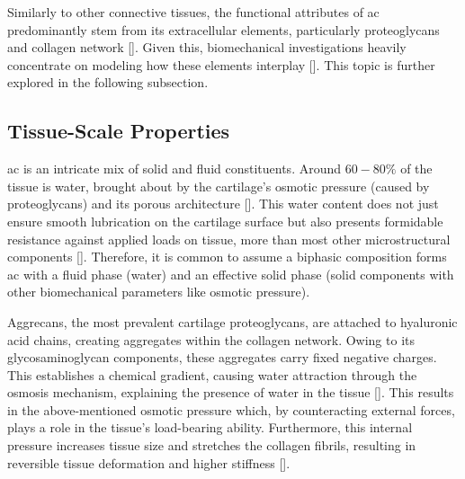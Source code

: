 Similarly to other connective tissues, the functional attributes of \ac{ac} predominantly stem from its extracellular elements, particularly proteoglycans and collagen network [\cite{culav1999,brody2015}]. Given this, biomechanical investigations heavily concentrate on modeling how these elements interplay [\cite{klika2016,ebrahimi2019,sajjadinia2019,lin2021,paz2022}]. This topic is further explored in the following subsection.

\subsection{Tissue-Scale Properties}
\Ac{ac} is an intricate mix of solid and fluid constituents. Around $60-80\%$ of the tissue is water, brought about by the cartilage's osmotic pressure (caused by proteoglycans) and its porous architecture [\cite{cederlund2022}]. This water content does not just ensure smooth lubrication on the cartilage surface but also presents formidable resistance against applied loads on tissue, more than most other microstructural components [\cite{quiroga2017,sajjadinia2019}]. Therefore, it is common to assume a biphasic composition forms \ac{ac} with a fluid phase (water) and an effective solid phase (solid components with other biomechanical parameters like osmotic pressure).

Aggrecans, the most prevalent cartilage proteoglycans, are attached to hyaluronic acid chains, creating aggregates within the collagen network. Owing to its glycosaminoglycan components, these aggregates carry fixed negative charges. This establishes a chemical gradient, causing water attraction through the osmosis mechanism, explaining the presence of water in the tissue [\cite{kiani2002,gomez2020,johnson2021}]. This results in the above-mentioned osmotic pressure which, by counteracting external forces, plays a role in the tissue's load-bearing ability. Furthermore, this internal pressure increases tissue size and stretches the collagen fibrils, resulting in reversible tissue deformation and higher stiffness [\cite{dudhia2005}].

